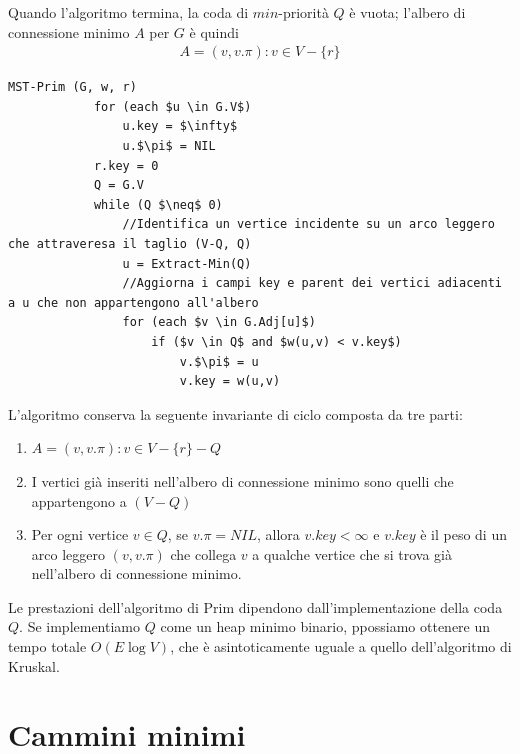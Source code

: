 Quando l'algoritmo termina, la coda di $min$-priorità $Q$ è vuota; l'albero di connessione minimo $A$ per $G$ è quindi
    \begin{equation}\begin{aligned}
        A = {(v, v.\pi): v \in V - \{r\}}
    \end{aligned}\end{equation}
    \begin{lstlisting}[caption = Algoritmi di Prim]
        MST-Prim (G, w, r)
            for (each $u \in G.V$)
                u.key = $\infty$
                u.$\pi$ = NIL
            r.key = 0
            Q = G.V
            while (Q $\neq$ 0)
                //Identifica un vertice incidente su un arco leggero che attraveresa il taglio (V-Q, Q)
                u = Extract-Min(Q)
                //Aggiorna i campi key e parent dei vertici adiacenti a u che non appartengono all'albero
                for (each $v \in G.Adj[u]$)
                    if ($v \in Q$ and $w(u,v) < v.key$)
                        v.$\pi$ = u
                        v.key = w(u,v)
    \end{lstlisting}
L'algoritmo conserva la seguente invariante di ciclo composta da tre parti:
    \begin{enumerate}
        \item{$A = {(v, v.\pi): v \in V - \{r\} - Q}$}
        \item{I vertici già inseriti nell'albero di connessione minimo sono quelli che appartengono a $(V - Q)$}
        \item{Per ogni vertice $v \in Q$, se $v.\pi = NIL$, allora $v.key < \infty$ e $v.key$ è il peso di un arco leggero $(v, v.\pi)$ che collega $v$ a qualche vertice che si trova già nell'albero di connessione minimo.}
    \end{enumerate}
Le prestazioni dell'algoritmo di Prim dipendono dall'implementazione della coda $Q$. Se implementiamo $Q$ come un heap minimo binario, ppossiamo ottenere un tempo totale $O(E \log V)$, che è asintoticamente uguale a quello dell'algoritmo di Kruskal.

\section{Cammini minimi}
